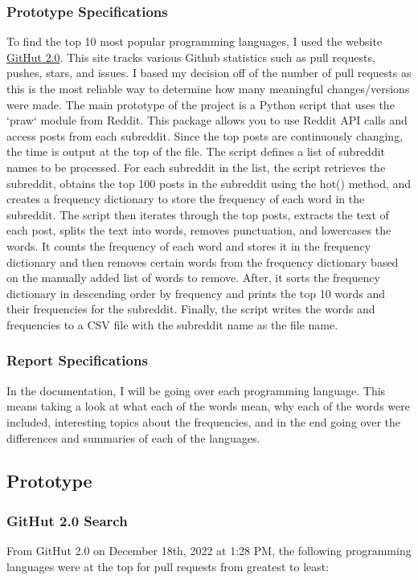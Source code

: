 \documentclass{article}
\theoremstyle{theorem}
\theoremstyle{definition}
\theoremstyle{remark}
\begin{document}
\subsubsection{Prototype Specifications}
To find the top 10 most popular programming languages, I used the website \href{https://madnight.github.io/githut/#/pull_requests/2022/3}{GitHut 2.0}. This site tracks various Github statistics such as pull requests, pushes, stars, and issues. I based my decision off of the number of pull requests as this is the most reliable way to determine how many meaningful changes/versions were made. The main prototype of the project is a Python script that uses the `praw` module from Reddit. This package allows you to use Reddit API calls and access posts from each subreddit. Since the top posts are continuously changing, the time is output at the top of the file. The script defines a list of subreddit names to be processed. For each subreddit in the list, the script retrieves the subreddit, obtains the top 100 posts in the subreddit using the hot() method, and creates a frequency dictionary to store the frequency of each word in the subreddit. The script then iterates through the top posts, extracts the text of each post, splits the text into words, removes punctuation, and lowercases the words. It counts the frequency of each word and stores it in the frequency dictionary and then removes certain words from the frequency dictionary based on the manually added list of words to remove. After, it sorts the frequency dictionary in descending order by frequency and prints the top 10 words and their frequencies for the subreddit. Finally, the script writes the words and frequencies to a CSV file with the subreddit name as the file name.

\subsubsection{Report Specifications}
In the documentation, I will be going over each programming language. This means taking a look at what each of the words mean, why each of the words were included, interesting topics about the frequencies, and in the end going over the differences and summaries of each of the languages.

\subsection{Prototype}

\subsubsection{GitHut 2.0 Search}
From GitHut 2.0 on December 18th, 2022 at 1:28 PM, the following programming languages were at the top for pull requests from greatest to least:
\end{document}

